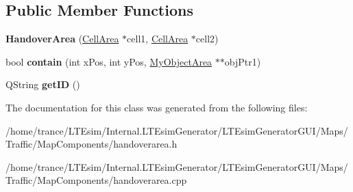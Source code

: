 \subsection*{Public Member Functions}
\begin{DoxyCompactItemize}
\item 
{\bfseries Handover\+Area} (\hyperlink{class_cell_area}{Cell\+Area} $\ast$cell1, \hyperlink{class_cell_area}{Cell\+Area} $\ast$cell2)\hypertarget{class_handover_area_a7beacdf5ff05d71038ddb261cc3cc2b7}{}\label{class_handover_area_a7beacdf5ff05d71038ddb261cc3cc2b7}

\item 
bool {\bfseries contain} (int x\+Pos, int y\+Pos, \hyperlink{class_my_object_area}{My\+Object\+Area} $\ast$$\ast$obj\+Ptr1)\hypertarget{class_handover_area_a3d8ea54fcc430d95073069553cdec841}{}\label{class_handover_area_a3d8ea54fcc430d95073069553cdec841}

\item 
Q\+String {\bfseries get\+ID} ()\hypertarget{class_handover_area_a6fffef300bed7a47bcdd5e96b070dda3}{}\label{class_handover_area_a6fffef300bed7a47bcdd5e96b070dda3}

\end{DoxyCompactItemize}


The documentation for this class was generated from the following files\+:\begin{DoxyCompactItemize}
\item 
/home/trance/\+L\+T\+Esim/\+Internal.\+L\+T\+Esim\+Generator/\+L\+T\+Esim\+Generator\+G\+U\+I/\+Maps/\+Traffic/\+Map\+Components/handoverarea.\+h\item 
/home/trance/\+L\+T\+Esim/\+Internal.\+L\+T\+Esim\+Generator/\+L\+T\+Esim\+Generator\+G\+U\+I/\+Maps/\+Traffic/\+Map\+Components/handoverarea.\+cpp\end{DoxyCompactItemize}
